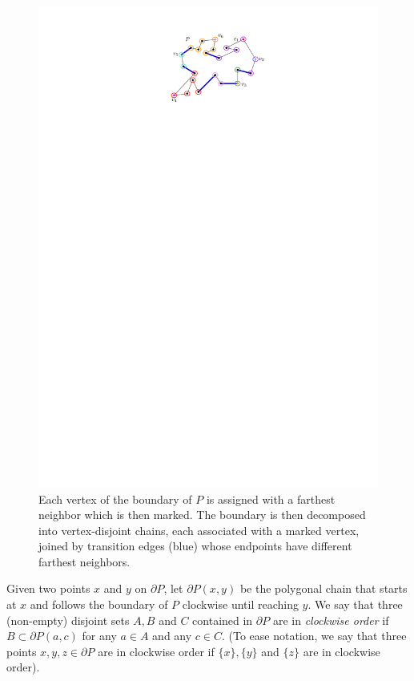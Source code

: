 \documentclass[a4paper]{article}
\begin{document}
\begin{figure}[tb]
\centering
\includegraphics{img/MarkedVertices.pdf}

\caption{\small Each vertex of the boundary of $P$ is assigned with a farthest neighbor which is then marked. 
The boundary is then decomposed into vertex-disjoint chains, each associated with a marked vertex, joined by transition edges (blue) whose endpoints have different farthest neighbors.}
\label{fig:Marked vertices decomposition}
\end{figure}

Given two points $x$ and $y$ on $\partial P$, let $\partial P(x,y)$ be the polygonal chain that starts at $x$ and follows the boundary of $P$ clockwise until reaching $y$.
We say that three (non-empty) disjoint sets $A,B$ and $C$ contained in $\partial P$ are in \emph{clockwise order} if $B\subset \partial P(a,c)$ for any $a\in A$ and any $c\in C$. (To ease notation, we say that three points $x,y,z\in \partial P$ are in clockwise order if $\{x\}, \{y\}$ and $\{z\}$ are in clockwise order).
\end{document}

